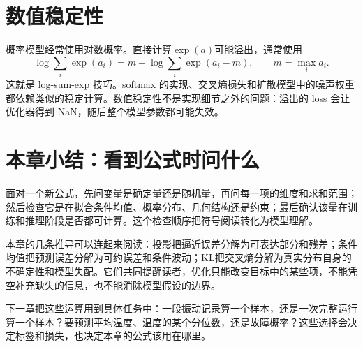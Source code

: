 \section{数值稳定性}
概率模型经常使用对数概率。直接计算$\exp(a)$可能溢出，通常使用
\begin{equation}
 \log\sum_i\exp(a_i)=m+\log\sum_i\exp(a_i-m),\qquad m=\max_i a_i.
\end{equation}
这就是 log-sum-exp 技巧。softmax 的实现、交叉熵损失和扩散模型中的噪声权重都依赖类似的稳定计算。数值稳定性不是实现细节之外的问题：溢出的 loss 会让优化器得到 NaN，随后整个模型参数都可能失效。

\section{本章小结：看到公式时问什么}
面对一个新公式，先问变量是确定量还是随机量，再问每一项的维度和求和范围；然后检查它是在拟合条件均值、概率分布、几何结构还是约束；最后确认该量在训练和推理阶段是否都可计算。这个检查顺序把符号阅读转化为模型理解。

本章的几条推导可以连起来阅读：投影把逼近误差分解为可表达部分和残差；条件均值把预测误差分解为可约误差和条件波动；KL把交叉熵分解为真实分布自身的不确定性和模型失配。它们共同提醒读者，优化只能改变目标中的某些项，不能凭空补充缺失的信息，也不能消除模型假设的边界。

下一章把这些运算用到具体任务中：一段振动记录算一个样本，还是一次完整运行算一个样本？要预测平均温度、温度的某个分位数，还是故障概率？这些选择会决定标签和损失，也决定本章的公式该用在哪里。


